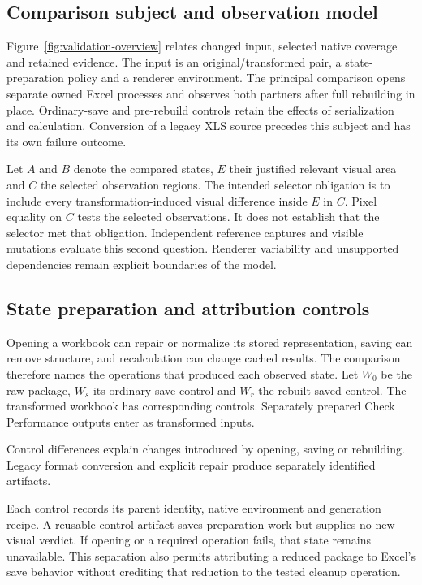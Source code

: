 \subsection{Comparison subject and observation model}
Figure~\ref{fig:validation-overview} relates changed input, selected native
coverage and retained evidence. The input is an original/transformed pair,
a state-preparation policy and a renderer environment. The principal comparison
opens separate owned Excel processes and observes both partners after full
rebuilding in place. Ordinary-save and pre-rebuild controls retain the effects
of serialization and calculation. Conversion of a legacy XLS source precedes
this subject and has its own failure outcome.

Let $A$ and $B$ denote the compared states, $E$ their justified relevant visual
area and $C$ the selected observation regions. The intended selector obligation
is to include every transformation-induced visual difference inside $E$ in $C$.
Pixel equality on $C$ tests the selected observations. It does not establish
that the selector met that obligation. Independent reference captures and
visible mutations evaluate this second question. Renderer variability and
unsupported dependencies remain explicit boundaries of the model.

\subsection{State preparation and attribution controls}
Opening a workbook can repair or normalize its stored representation, saving
can remove structure, and recalculation can change cached results. The comparison
therefore names the operations that produced each observed state. Let $W_0$ be
the raw package, $W_s$ its ordinary-save control and $W_r$ the rebuilt saved
control. The transformed workbook has corresponding controls.
Separately prepared Check Performance outputs enter as transformed inputs.

Control differences explain changes introduced by opening, saving or rebuilding.
Legacy format conversion and explicit repair produce
separately identified artifacts.

Each control records its parent identity, native environment and generation
recipe. A reusable control artifact saves preparation work but supplies no new
visual verdict. If opening or a required operation fails, that state remains
unavailable.
This separation also permits attributing a reduced package to Excel's save
behavior without crediting that reduction to the tested cleanup operation.


